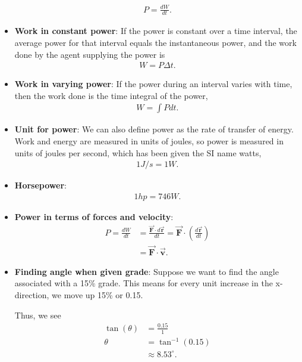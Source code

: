 \documentclass{report}
\begin{document}
\begin{itemize}
        \begin{align*}
            P = \frac{dW}{dt}
        .\end{align*}
    \item \textbf{Work in constant power}: If the power is constant over a time interval, the average power for that interval equals the instantaneous power, and the work done by the agent supplying the power is
        \begin{align*}
            W = P\Delta t
        .\end{align*}
    \item \textbf{Work in varying power}: If the power during an interval varies with time, then the work done is the time integral of the power,
        \begin{align*}
            W = \int Pdt
        .\end{align*}
    \item \textbf{Unit for power}:  We can also define power as the rate of transfer of energy. Work and energy are measured in units of joules, so power is measured in units of joules per second, which has been given the SI name watts,
        \begin{align*}
            1 J/s = 1 W
        .\end{align*}
    \item \textbf{Horsepower}:
        \begin{align*}
            1hp = 746 W
        .\end{align*}
    \item \textbf{Power in terms of forces and velocity}:
        \begin{align*}
            P = \frac{dW}{dt} &= \frac{\vec{\mathbf{F}} \cdot d\vec{\mathbf{r}}}{dt} = \vec{\mathbf{F}} \cdot \left(\frac{d\vec{\mathbf{r}}}{dt}\right) \\
            &=\vec{\mathbf{F}} \cdot \vec{\mathbf{v}}
        .\end{align*}
    \item \textbf{Finding angle when given grade}: Suppose we want to find the angle associated with a 15\% grade. This means for every unit increase in the x-direction, we move up 15\% or 0.15.
        \bigbreak \noindent 
\begin{figure}[ht]
    \centering
    \label{fig:grade}
\end{figure}
\bigbreak \noindent 
Thus, we see
\begin{align*}
    \tan{\left(\theta \right)} &= \frac{0.15}{1} \\
    \theta &=\tan^{-1}{\left(0.15\right)} \\
           &\approx 8.53^{\circ}
.\end{align*}
    \end{itemize}
\end{document}
